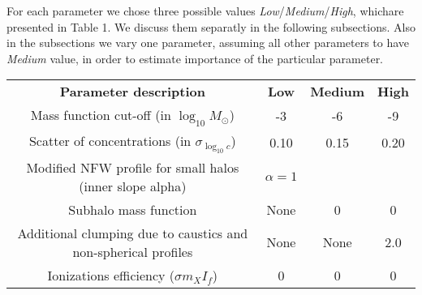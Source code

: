 For each parameter we chose three possible values \textit{Low}/\textit{Medium}/\textit{High}, whichare presented in Table 1. We discuss them separatly in the following subsections. Also in the subsections we vary one parameter, assuming all other parameters to have \textit{Medium} value, in order to estimate importance of the particular parameter.

\begin{table}
    \begin{tabular}{ c c c c }
    \textbf{Parameter description}                                    & \textbf{Low} & \textbf{Medium} & \textbf{High} \hline \hline \\
    Mass function cut-off (in $\log_{10}M_\odot$)        & -3 & -6 & -9 \\
    Scatter of concentrations (in $\sigma_{\log_{10}c}$)              & 0.10 & 0.15 & 0.20 \\
    Modified NFW profile for small halos (inner slope alpha) & $\alpha=1$ & \cite{Ishiyama_2014} &  \cite{Ishiyama_2014} \\
    Subhalo mass function & None & 0 & 0 \\
    Additional clumping due to caustics and non-spherical profiles & None & None & 2.0
\\    
    Ionizations efficiency ($\sigma m_X I_f$) & 0 & 0 & 0
\\    \end{tabular}
\end{table}
